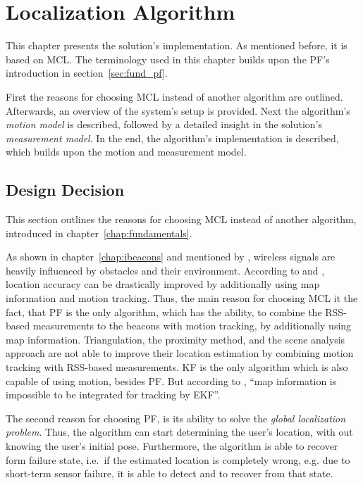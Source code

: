 \chapter{Localization Algorithm} \label{chap:pf}
This chapter presents the solution's implementation. As mentioned before, it is based on \acf{MCL}. The terminology used in this chapter builds upon the \acs{PF}'s introduction in section~\ref{sec:fund_pf}.

First the reasons for choosing \acs{MCL} instead of another algorithm are outlined. Afterwards, an overview of the system's setup is provided. Next the algorithm's \emph{motion model} is described, followed by a detailed insight in the solution's \emph{measurement model}. In the end, the algorithm's implementation is described, which builds upon the motion and measurement model.


\section{Design Decision} \label{sec:algo_decision}
This section outlines the reasons for choosing \acl{MCL} instead of another algorithm, introduced in chapter~\ref{chap:fundamentals}.

As shown in chapter~\ref{chap:ibeacons} and mentioned by \citet{IEEE:survey_wireless_indoor_pos}, wireless signals are heavily influenced by obstacles and their environment. According to \citet{wang:wlan} and \citet{siddiqi:experiments_mcl_wifi}, location accuracy can be drastically improved by additionally using map information and motion tracking. Thus, the main reason for choosing \ac{MCL} it the fact, that \acl{PF} is the only algorithm, which has the ability, to combine the \acs{RSS}-based measurements to the beacons with motion tracking, by additionally using map information. Triangulation, the proximity method, and the scene analysis approach are not able to improve their location estimation by combining motion tracking with \ac{RSS}-based measurements. \acl{KF} is the only algorithm which is also capable of using motion, besides \ac{PF}. But according to \citet{wang:wlan}, ``map information is impossible to be integrated for tracking by \acs{EKF}''.

The second reason for choosing \acs{PF}, is its ability to solve the \emph{global localization problem}. Thus, the algorithm can start determining the user's location, with out knowing the user's initial pose. Furthermore, the algorithm is able to recover form failure state, i.e.\ if the estimated location is completely wrong, e.g. due to short-term sensor failure, it is able to detect and to recover from that state.

